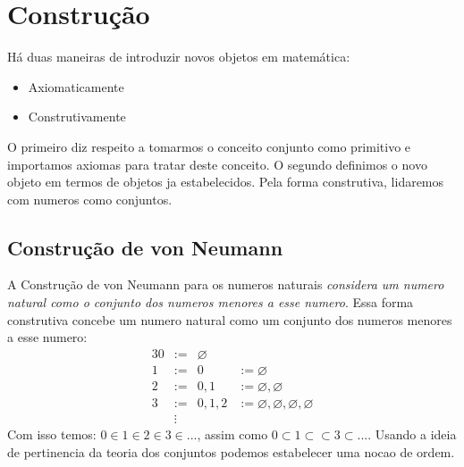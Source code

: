 \section{Construção}
   Há duas maneiras de introduzir novos objetos em matemática:
   \begin{itemize}
      \item Axiomaticamente
      \item Construtivamente
   \end{itemize}
   O primeiro diz respeito a tomarmos o conceito conjunto como primitivo e importamos axiomas para tratar deste conceito. O segundo definimos o novo objeto em termos de objetos ja estabelecidos. Pela forma construtiva, lidaremos com numeros como conjuntos.
   \subsection{Construção de von Neumann}
      A Construção de von Neumann para os numeros naturais \emph{considera um numero natural como o conjunto dos numeros menores a esse numero}.
      Essa forma construtiva concebe um numero natural como um conjunto dos numeros menores a esse numero:
      \begin{alignat}{3}
         \nonumber 0 &:=& \varnothing\\
         \nonumber 1 &:=& {0} &:= {\varnothing}\\
         \nonumber 2 &:=& {0,1}& := {\varnothing, {\varnothing}}\\
         \nonumber 3 &:=& {0,1,2} &:= {\varnothing, {\varnothing}, {\varnothing, {\varnothing}}}\\
         \nonumber &\vdots
      \end{alignat}
      Com isso temos: $0 \in 1 \in 2 \in 3 \in ...$, assim como $ 0 \subset 1 \subset \subset 3 \subset ...$. Usando a ideia de pertinencia da teoria dos conjuntos podemos estabelecer uma nocao de ordem.
